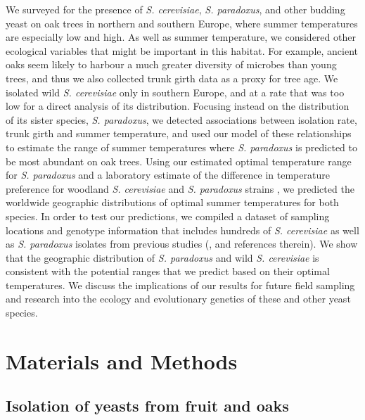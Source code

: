 \documentclass[12pt]{article}
\begin{document}
\begin{linenumbers}
We surveyed for the presence of \textit{S. cerevisiae}, \textit{S. paradoxus}, and other budding yeast on oak trees in northern and southern Europe, where summer temperatures are especially low and high. As well as summer temperature, we considered other ecological variables that might be important in this habitat. For example, ancient oaks seem likely to harbour a much greater diversity of microbes than young trees, and thus we also collected trunk girth data as a proxy for tree age. We isolated wild \textit{S. cerevisiae} only in southern Europe, and at a rate that was too low for a direct analysis of its distribution. Focusing instead on the distribution of its sister species, \textit{S. paradoxus}, we detected associations between isolation rate, trunk girth and summer temperature, and used our model of these relationships to estimate the range of summer temperatures where \textit{S. paradoxus} is predicted to be most abundant on oak trees. Using our estimated optimal temperature range for \textit{S. paradoxus} and a laboratory estimate of the difference in temperature preference for woodland \textit{S. cerevisiae} and \textit{S. paradoxus} strains \citep{sweeney_sympatric_2004}, we predicted the worldwide geographic distributions of optimal summer temperatures for both species. In order to test our predictions, we compiled a dataset of sampling locations and genotype information that includes hundreds of \textit{S. cerevisiae} as well as \textit{S. paradoxus} isolates from previous studies (\citealp{liti_population_2009, zhang_saccharomyces_2010,kuehne_allopatric_2007,leducq_local_2014,naumov_differentiation_1997,cromie_genomic_2013,wang_surprisingly_2012,almeida_population_2015}, and references therein). We show that the geographic distribution of  \textit{S. paradoxus} and wild \textit{S. cerevisiae} is consistent with the potential ranges that we predict based on their optimal temperatures. We discuss the implications of our results for future field sampling and research into the ecology and evolutionary genetics of these and other yeast species.

\clearpage

\section*{Materials and Methods}
\label{sec:Methods}

\subsection*{Isolation of yeasts from fruit and oaks}


\end{linenumbers}
\end{document}
